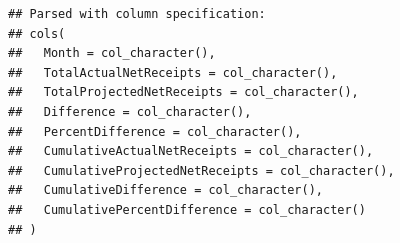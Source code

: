 \documentclass[]{book}
\newenvironment{Shaded}{\begin{snugshade}}{\end{snugshade}}
\newcommand{\CharTok}[1]{\textcolor[rgb]{0.31,0.60,0.02}{#1}}
\newcommand{\DataTypeTok}[1]{\textcolor[rgb]{0.13,0.29,0.53}{#1}}
\newcommand{\KeywordTok}[1]{\textcolor[rgb]{0.13,0.29,0.53}{\textbf{#1}}}
\newcommand{\NormalTok}[1]{#1}
\newcommand{\OperatorTok}[1]{\textcolor[rgb]{0.81,0.36,0.00}{\textbf{#1}}}
\newcommand{\StringTok}[1]{\textcolor[rgb]{0.31,0.60,0.02}{#1}}
\begin{document}
\begin{Shaded}
\begin{Highlighting}[]
{{  \DataTypeTok{CumulativeProjectedNetReceipts =} \KeywordTok{gsub}\NormalTok{(}\StringTok{"}\CharTok{\textbackslash{}\textbackslash{}}\StringTok{$"}\NormalTok{,}\StringTok{""}\NormalTok{,CumulativeProjectedNetReceipts),}
  \DataTypeTok{CumulativeDifference =} \KeywordTok{gsub}\NormalTok{(}\StringTok{","}\NormalTok{,}\StringTok{""}\NormalTok{,CumulativeDifference),}
  \DataTypeTok{CumulativeDifference =} \KeywordTok{gsub}\NormalTok{(}\StringTok{"}\CharTok{\textbackslash{}\textbackslash{}}\StringTok{$"}\NormalTok{,}\StringTok{""}\NormalTok{,CumulativeDifference),}
  \DataTypeTok{CumulativePercentDifference =} \KeywordTok{gsub}\NormalTok{(}\StringTok{"}\CharTok{\textbackslash{}\textbackslash{}}\StringTok{%
\NormalTok{  ) }\OperatorTok{%
\end{Highlighting}
\end{Shaded}

\begin{verbatim}
## Parsed with column specification:
## cols(
##   Month = col_character(),
##   TotalActualNetReceipts = col_character(),
##   TotalProjectedNetReceipts = col_character(),
##   Difference = col_character(),
##   PercentDifference = col_character(),
##   CumulativeActualNetReceipts = col_character(),
##   CumulativeProjectedNetReceipts = col_character(),
##   CumulativeDifference = col_character(),
##   CumulativePercentDifference = col_character()
## )
\end{verbatim}
\end{document}
